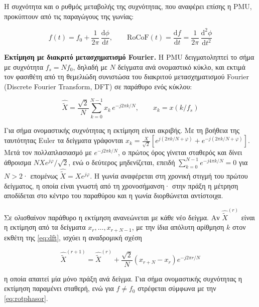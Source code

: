 Η συχνότητα και ο ρυθμός μεταβολής της συχνότητας, που αναφέρει επίσης η PMU, προκύπτουν
από τις παραγώγους της γωνίας:

\begin{equation}
f(t) = f_0 + \frac{1}{2\pi}\,\frac{\mathrm{d}\phi}{\mathrm{d}t}, \qquad
\mathrm{RoCoF}(t) = \frac{\mathrm{d}f}{\mathrm{d}t}
= \frac{1}{2\pi}\,\frac{\mathrm{d}^2\phi}{\mathrm{d}t^2}
\label{eq:pmufreq}
\end{equation}

\textbf{Εκτίμηση με διακριτό μετασχηματισμό Fourier.} Η PMU δειγματοληπτεί το σήμα με
συχνότητα $f_s = N f_0$, δηλαδή με $N$ δείγματα ανά ονομαστικό κύκλο, και εκτιμά τον
φασιθέτη από τη θεμελιώδη συνιστώσα του διακριτού μετασχηματισμού Fourier (Discrete Fourier
Transform, DFT) σε παράθυρο ενός κύκλου:

\begin{equation}
\hat{\tilde{X}} = \frac{\sqrt{2}}{N} \sum_{k=0}^{N-1} x_k\, e^{-j 2\pi k / N},
\qquad x_k = x(k/f_s)
\label{eq:dft}
\end{equation}

Για σήμα ονομαστικής συχνότητας η εκτίμηση είναι ακριβής. Με τη βοήθεια της ταυτότητας
Euler τα δείγματα γράφονται
$x_k = \frac{X}{\sqrt{2}}\left[e^{j(2\pi k/N + \varphi)} + e^{-j(2\pi k/N + \varphi)}\right]$.
Μετά τον πολλαπλασιασμό με $e^{-j2\pi k/N}$, ο πρώτος όρος γίνεται σταθερός και δίνει
άθροισμα $N X e^{j\varphi}/\sqrt{2}$, ενώ ο δεύτερος μηδενίζεται, επειδή
$\sum_{k=0}^{N-1} e^{-j4\pi k/N} = 0$ για $N > 2$· επομένως $\hat{\tilde{X}} = X e^{j\varphi}$.
Η γωνία αναφέρεται στη χρονική στιγμή του πρώτου δείγματος, η οποία είναι γνωστή από τη
χρονοσήμανση· στην πράξη η μέτρηση αποδίδεται στο κέντρο του παραθύρου και η γωνία
διορθώνεται αντίστοιχα.

Σε ολισθαίνον παράθυρο η εκτίμηση ανανεώνεται με κάθε νέο δείγμα. Αν $\hat{\tilde{X}}^{(r)}$
είναι η εκτίμηση από τα δείγματα $x_r, \ldots, x_{r+N-1}$, με την ίδια απόλυτη αρίθμηση
$k$ στον εκθέτη της \eqref{eq:dft}, ισχύει η αναδρομική σχέση

\begin{equation}
\hat{\tilde{X}}^{(r+1)} = \hat{\tilde{X}}^{(r)}
+ \frac{\sqrt{2}}{N}\left(x_{r+N} - x_r\right) e^{-j2\pi r/N}
\label{eq:recdft}
\end{equation}

η οποία απαιτεί μία μόνο πράξη ανά δείγμα. Για σήμα ονομαστικής συχνότητας η εκτίμηση
παραμένει σταθερή, ενώ για $f \neq f_0$ στρέφεται σύμφωνα με την \eqref{eq:rotphasor}.

